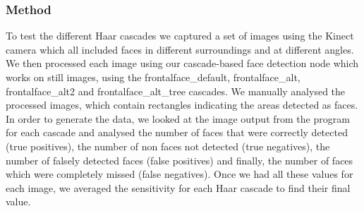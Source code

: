 \documentclass[conference]{IEEEtran}
\begin{document}
\subsubsection{Method}
To test the different Haar cascades we captured a set of images using the Kinect camera which all included faces in different surroundings and at different angles. We then processed each image using our cascade-based face detection node which works on still images, using the frontalface\_default, frontalface\_alt, frontalface\_alt2 and frontalface\_alt\_tree cascades. We manually analysed the processed images, which contain rectangles indicating the areas detected as faces. In order to generate the data, we looked at the image output from the program for each cascade and analysed the number of faces that were correctly detected (true positives), the number of non faces not detected (true negatives), the number of falsely detected faces (false positives) and finally, the number of faces which were completely missed (false negatives). Once we had all these values for each image, we averaged the sensitivity for each Haar cascade to find their final value.
\end{document}
